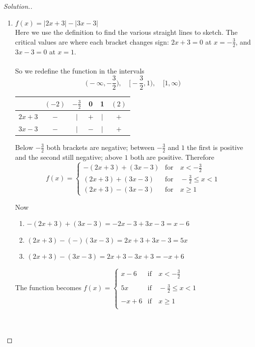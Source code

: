 \documentclass[11pt,a4paper]{article}
\theoremstyle{definition}
\newenvironment{solution}
  {\renewcommand{\qedsymbol}{}\begin{proof}[\textit{Solution}.]}
  {\end{proof}}
\begin{document}
\begin{solution}
\begin{enumerate}
\begin{enumerate}
     
     \item $f(x)=|2x+3|-|3x-3|$\\
     Here we use the definition to find the various straight lines to sketch. The
     critical values are where each bracket changes sign: $2x+3=0$ at
     $x=-\frac{3}{2}$, and $3x-3=0$ at $x=1$.\\\\
     So we redefine the function in the intervals $$\bigg(-\infty,-\frac{3}{2}\bigg),\quad  \bigg [-\frac{3}{2},1\bigg),\quad  [1,\infty)$$
     
\begin{table}[H]
\centering
\begin{tabular}{cccccc}
&$(-2)$&$-\frac{3}{2}$&0&1&$(2)$\\
\hline
\multicolumn{1}{c|}{$2x+3$} & $-$ & $|$ & $+$ & $|$ & $+$\\
\multicolumn{1}{c|}{$3x-3$} & $-$ & $|$ & $-$ & $|$ & $+$\\
\end{tabular}
\end{table}


\vspace{0.6cm}
Below $-\frac{3}{2}$ both brackets are negative; between $-\frac{3}{2}$ and $1$ the
first is positive and the second still negative; above $1$ both are positive.
Therefore
$$f(x)=
\begin{cases}
-(2x+3)+(3x-3) & \text{for}\quad  x<-\frac{3}{2}\\[4pt]
(2x+3)+(3x-3) &\text{for}\quad  -\frac{3}{2}\leq x<1\\[4pt]
(2x+3)-(3x-3) &\text{for}\quad x\geq 1
\end{cases}$$


Now
\begin{enumerate}
         \item $-(2x+3)+(3x-3)=-2x-3+3x-3=x-6$
         \item $(2x+3)-(-)(3x-3)=2x+3+3x-3=5x$
         \item $(2x+3)-(3x-3)=2x+3-3x+3=-x+6$
\end{enumerate}

The function becomes $f(x)=
\begin{cases}
x-6 & \text{if}\quad  x<-\frac{3}{2}\\\\
5x & \text{if} \quad  -\frac{3}{2}\leq x<1\\\\
-x+6 & \text{if}\quad  x\geq 1\\
\end{cases}
$\\\\\\





\end{enumerate}
\end{enumerate}
\end{solution}
\end{document}
